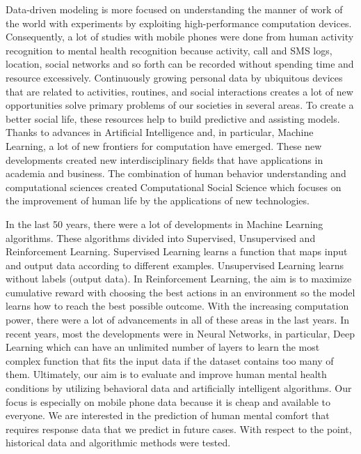 \documentclass[12pt,oneandhalf,chaparabic,lfm,phd,eng,oneside,pntc]{gsufbe}
\begin{document}
Data-driven modeling is more focused on understanding the manner of work of the world with experiments by exploiting high-performance computation devices. Consequently, a lot of studies with mobile phones were done from human activity recognition to mental health recognition because activity, call and SMS logs, location, social networks and so forth can be recorded without spending time and resource excessively. Continuously growing personal data by ubiquitous devices that are related to activities, routines, and social interactions creates a lot of new opportunities solve primary problems of our societies in several areas. To create a better social life, these resources help to build predictive and assisting models. Thanks to advances in Artificial Intelligence and, in particular, Machine Learning, a lot of new frontiers for computation have emerged. These new developments created new interdisciplinary fields that have applications in academia and business. The combination of human behavior understanding and computational sciences created Computational Social Science which focuses on the improvement of human life by the applications of new technologies. 

In the last 50 years, there were a lot of developments in Machine Learning algorithms. These algorithms divided into Supervised, Unsupervised and Reinforcement Learning. Supervised Learning learns a function that maps input and output data according to different examples. Unsupervised Learning learns without labels (output data). In Reinforcement Learning, the aim is to maximize cumulative reward with choosing the best actions in an environment so the model learns how to reach the best possible outcome. With the increasing computation power, there were a lot of advancements in all of these areas in the last years. In recent years, most the developments were in Neural Networks, in particular, Deep Learning which can have an unlimited number of layers to learn the most complex function that fits the input data if the dataset contains too many of them. Ultimately, our aim is to evaluate and improve human mental health conditions by utilizing behavioral data and artificially intelligent algorithms. Our focus is especially on mobile phone data because it is cheap and available to everyone. We are interested in the prediction of human mental comfort that requires response data that we predict in future cases. With respect to the point, historical data and algorithmic methods were tested. 
\end{document}
